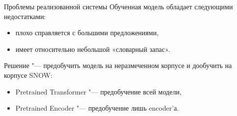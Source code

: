 \begin{frame}[fragile]{Проблемы реализованной системы}%
  Обученная модель обладает следующими недостатками:
  \begin{itemize}%
    \item плохо справляется с большими предложениями,
    \item имеет относительно небольшой «словарный запас».
  \end{itemize}

  Решение "--- предобучить  модель на неразмеченном корпусе и дообучить  на корпусе SNOW:
  \begin{itemize}%
    \item Pretrained Transformer "--- предобучение всей модели,
    \item Pretrained Encoder "--- предобучение лишь encoder'а.
  \end{itemize}
\end{frame}
